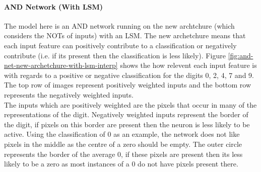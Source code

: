 \paragraph{AND Network (With LSM)}
The model here is an AND network running on the new archtchure (which considers the NOTs of inputs) with an LSM. The new archetchure means that each input feature can positively contribute to a classification or negatively contribute (i.e. if its present then the classification is less likely). Figure \ref{fig:and-net-new-archetchure-with-lsm-interp} shows the how relevent each input feature is with regards to a positive or negative classification for the digits 0, 2, 4, 7 and 9. The top row of images represent positively weighted inputs and the bottom row represents the negatively weighted inputs.\\

The inputs which are positively weighted are the pixels that occur in many of the representations of the digit. Negatively weighted inputs represent the border of the digit, if pixels on this border are present then the neuron is less likely to be active. Using the classification of 0 as an example, the network does not like pixels in the middle as the centre of a zero should be empty. The outer circle represents the border of the average 0, if these pixels are present then its less likely to be a zero as most instances of a 0 do not have pixels present there.


